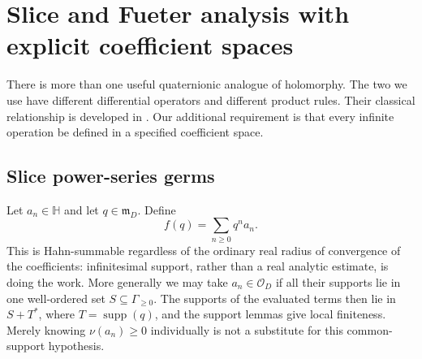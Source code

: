 \documentclass[11pt,letterpaper]{article}
\theoremstyle{definition}
\newcommand{\HH}{\mathbb H}
\newcommand{\OO}{\mathcal O}
\newcommand{\mm}{\mathfrak m}
\newcommand{\val}{\nu}
\DeclareMathOperator{\supp}{supp}
\begin{document}
\section{Slice and Fueter analysis with explicit coefficient spaces}
\label{sec:analysis}
There is more than one useful quaternionic analogue of holomorphy. The two we
use have different differential operators and different product rules. Their
classical relationship is developed in \cite{gp}. Our additional requirement
is that every infinite operation be defined in a specified coefficient space.

\subsection{Slice power-series germs}
Let $a_n\in\HH$ and let $q\in\mm_D$. Define
\[
 f(q)=\sum_{n\ge0}q^n a_n.
\]
This is Hahn-summable regardless of the ordinary real radius of convergence of
the coefficients: infinitesimal support, rather than a real analytic estimate,
is doing the work. More generally we may take $a_n\in\OO_D$ if all their
supports lie in one well-ordered set $S\subseteq\Gamma_{\ge0}$. The supports of
the evaluated terms then lie in $S+T^*$, where $T=\supp(q)$, and the support
lemmas give local finiteness. Merely knowing $\val(a_n)\ge0$ individually is
not a substitute for this common-support hypothesis.
\end{document}
